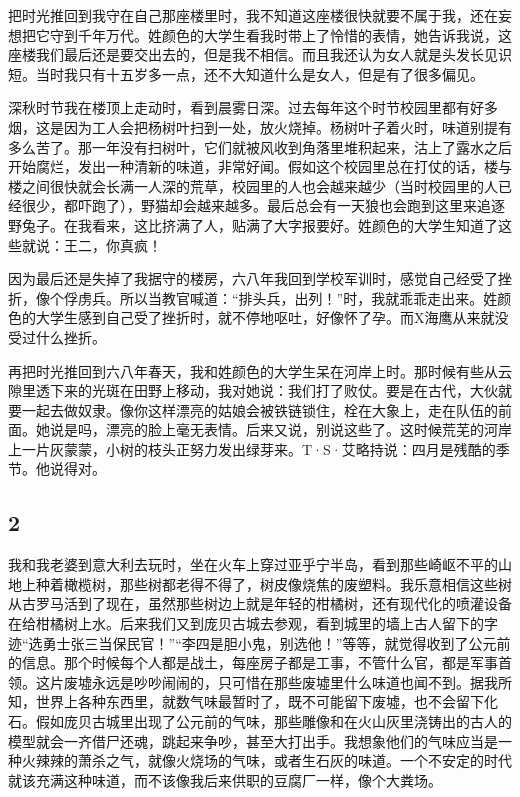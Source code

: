 把时光推回到我守在自己那座楼里时，我不知道这座楼很快就要不属于我，还在妄想把它守到千年万代。姓颜色的大学生看我时带上了怜惜的表情，她告诉我说，这座楼我们最后还是要交出去的，但是我不相信。而且我还认为女人就是头发长见识短。当时我只有十五岁多一点，还不大知道什么是女人，但是有了很多偏见。 

深秋时节我在楼顶上走动时，看到晨雾日深。过去每年这个时节校园里都有好多烟，这是因为工人会把杨树叶扫到一处，放火烧掉。杨树叶子着火时，味道别提有多么苦了。那一年没有扫树叶，它们就被风收到角落里堆积起来，沽上了露水之后开始腐烂，发出一种清新的味道，非常好闻。假如这个校园里总在打仗的话，楼与楼之间很快就会长满一人深的荒草，校园里的人也会越来越少（当时校园里的人已经很少，都吓跑了），野猫却会越来越多。最后总会有一天狼也会跑到这里来追逐野兔子。在我看来，这比挤满了人，贴满了大字报要好。姓颜色的大学生知道了这些就说：王二，你真疯！ 

因为最后还是失掉了我据守的楼房，六八年我回到学校军训时，感觉自己经受了挫折，像个俘虏兵。所以当教官喊道：“排头兵，出列！”时，我就乖乖走出来。姓颜色的大学生感到自己受了挫折时，就不停地呕吐，好像怀了孕。而X海鹰从来就没受过什么挫折。 

再把时光推回到六八年春天，我和姓颜色的大学生呆在河岸上时。那时候有些从云隙里透下来的光斑在田野上移动，我对她说：我们打了败仗。要是在古代，大伙就要一起去做奴隶。像你这样漂亮的姑娘会被铁链锁住，栓在大象上，走在队伍的前面。她说是吗，漂亮的脸上毫无表情。后来又说，别说这些了。这时候荒芜的河岸上一片灰蒙蒙，小树的枝头正努力发出绿芽来。T·S·艾略持说：四月是残酷的季节。他说得对。 

\subsection{2} 

我和我老婆到意大利去玩时，坐在火车上穿过亚乎宁半岛，看到那些崎岖不平的山地上种着橄榄树，那些树都老得不得了，树皮像烧焦的废塑料。我乐意相信这些树从古罗马活到了现在，虽然那些树边上就是年轻的柑橘树，还有现代化的喷灌设备在给柑橘树上水。后来我们又到庞贝古城去参观，看到城里的墙上古人留下的字迹“选勇士张三当保民官！”“李四是胆小鬼，别选他！”等等，就觉得收到了公元前的信息。那个时候每个人都是战土，每座房子都是工事，不管什么官，都是军事首领。这片废墟永远是吵吵闹闹的，只可惜在那些废墟里什么味道也闻不到。据我所知，世界上各种东西里，就数气味最暂时了，既不可能留下废墟，也不会留下化石。假如庞贝古城里出现了公元前的气味，那些雕像和在火山灰里浇铸出的古人的模型就会一齐借尸还魂，跳起来争吵，甚至大打出手。我想象他们的气味应当是一种火辣辣的萧杀之气，就像火烧场的气味，或者生石灰的味道。一个不安定的时代就该充满这种味道，而不该像我后来供职的豆腐厂一样，像个大粪场。 

